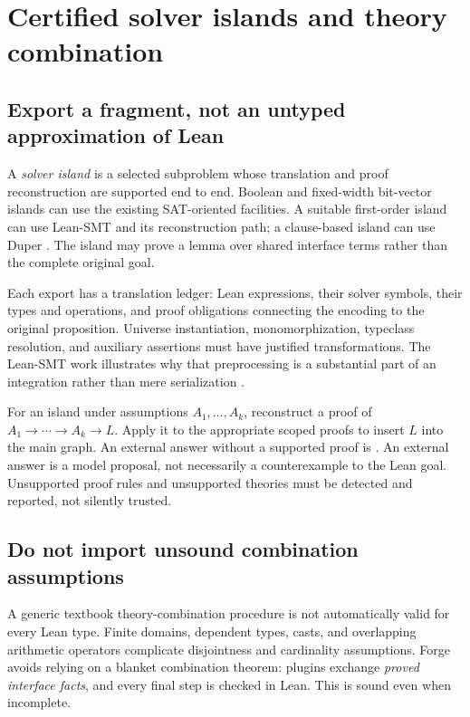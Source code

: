 \section{Certified solver islands and theory combination}

\subsection{Export a fragment, not an untyped approximation of Lean}

A \emph{solver island} is a selected subproblem whose translation and proof
reconstruction are supported end to end. Boolean and fixed-width bit-vector
islands can use the existing SAT-oriented facilities. A suitable first-order
island can use Lean-SMT and its reconstruction path; a clause-based island can
use Duper \cite{lean-grind,lean-smt,duper}. The island may prove a lemma over
shared interface terms rather than the complete original goal.

Each export has a translation ledger: Lean expressions, their solver symbols,
their types and operations, and proof obligations connecting the encoding to
the original proposition. Universe instantiation, monomorphization, typeclass
resolution, and auxiliary assertions must have justified transformations.
The Lean-SMT work illustrates why that preprocessing is a substantial part of
an integration rather than mere serialization \cite{lean-smt}.

For an island under assumptions $A_1,\ldots,A_k$, reconstruct a proof of
$A_1\to\cdots\to A_k\to L$. Apply it to the appropriate scoped proofs to
insert $L$ into the main graph. An external  answer without a
supported proof is . An external  answer is a model
proposal, not necessarily a counterexample to the Lean goal. Unsupported proof
rules and unsupported theories must be detected and reported, not silently
trusted.

\subsection{Do not import unsound combination assumptions}

A generic textbook theory-combination procedure is not automatically valid
for every Lean type. Finite domains, dependent types, casts, and overlapping
arithmetic operators complicate disjointness and cardinality assumptions.
Forge avoids relying on a blanket combination theorem: plugins exchange
\emph{proved interface facts}, and every final step is checked in Lean.
This is sound even when incomplete.

